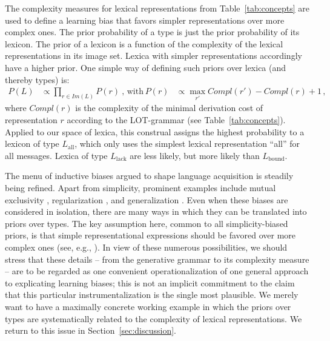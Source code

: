 \documentclass[a4paper, 11pt]{article}
\theoremstyle{Satz}
\newcommand{\mylang}[1]{\ensuremath{L_{\text{#1}}}\xspace} %
\newcommand{\Lall}{\mylang{all}}
\newcommand{\Lbound}{\mylang{bound}}
\newcommand{\Llack}{\mylang{lack}}
\begin{document}
The complexity measures for lexical representations from Table~\ref{tab:concepts} are used to
define a learning bias that favors simpler representations over more complex ones. The prior
probability of a type is just the prior probability of its lexicon. The prior of a lexicon is a
function of the complexity of the lexical representations in its image set. Lexica with simpler
representations accordingly have a higher prior. One simple way of defining such priors over
lexica (and thereby types) is:
\begin{align*}
  P(L)  & \propto \prod_{r \in Im(L)} P(r)   \ \text{, with} & 
  P(r) & \propto \max_{r'}Compl(r') - Compl(r) + 1\,,
\end{align*}
where $Compl(r)$ is the complexity of the minimal derivation cost of representation $r$ according to the
LOT-grammar (see Table~\ref{tab:concepts}). Applied to our space of lexica, this construal assigns the highest probability 
to a lexicon of type $\Lall$, which only uses the simplest lexical representation ``all'' for
all messages. Lexica of type $\Llack$ are less likely, but more likely than $\Lbound$. 

The menu of inductive biases argued to shape language acquisition is steadily being
refined. Apart from simplicity, prominent examples include mutual exclusivity
\citep{merriman+bowman:1989,clark:2009}, regularization \citep{hudson+etal:2005}, and
generalization \citep{smith:2011}. Even when these biases are considered in isolation, there
are many ways in which they can be translated into priors over types. The key assumption here,
common to all simplicity-biased priors, is that simple representational expressions should be
favored over more complex ones (see, e.g., \citealt{goodman+etal:2008, piantadosi+etal:2012a,
  kirby+etal:2015}). In view of these numerous possibilities, we should stress that these
details -- from the generative grammar to its complexity measure -- are to be regarded as one
convenient operationalization of one general approach to explicating learning biases; this is
not an implicit commitment to the claim that this particular instrumentalization is the single
most plausible. We merely want to have a maximally concrete working example in
which the priors over types are systematically related to the complexity of lexical
representations. We return to this issue in Section~\ref{sec:discussion}.
\end{document}
